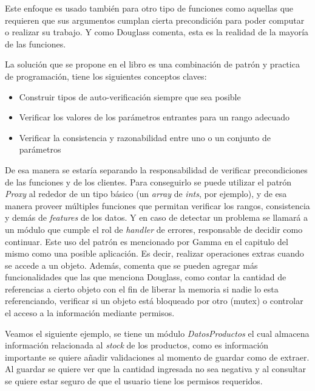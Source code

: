 Este enfoque es usado también para otro tipo de funciones como aquellas que requieren que sus argumentos cumplan cierta precondición para poder computar o realizar su trabajo. Y como Douglass comenta, esta es la realidad de la mayoría de las funciones.

La solución que se propone en el libro es una combinación de patrón y practica de programación, tiene los siguientes conceptos claves:

\begin{itemize}
    \item Construir tipos de auto-verificación siempre que sea posible
    \item Verificar los valores de los parámetros entrantes para un rango adecuado
    \item Verificar la consistencia y razonabilidad entre uno o un conjunto de parámetros
\end{itemize}

De esa manera se estaría separando la responsabilidad de verificar precondiciones de las funciones y de los clientes. Para conseguirlo se puede utilizar el patrón \textit{Proxy} al rededor de un tipo básico (un \textit{array} de \textit{ints}, por ejemplo), y de esa manera proveer múltiples funciones que permitan verificar los rangos, consistencia y demás de \textit{features} de los datos. Y en caso de detectar un problema se llamará a un módulo que cumple el rol de \textit{handler} de errores, responsable de decidir como continuar. Este uso del patrón es mencionado por Gamma en el capitulo del mismo como una posible aplicación. Es decir, realizar operaciones extras cuando se accede a un objeto. Además, comenta que se pueden agregar más funcionalidades que las que menciona Douglass, como contar la cantidad de referencias a cierto objeto con el fin de liberar la memoria si nadie lo esta referenciando, verificar si un objeto está bloqueado por otro (mutex) o controlar el acceso a la información mediante permisos.

Veamos el siguiente ejemplo, se tiene un módulo \textit{DatosProductos} el cual almacena información relacionada al \textit{stock} de los productos, como es información importante se quiere añadir validaciones al momento de guardar como de extraer. Al guardar se quiere ver que la cantidad ingresada no sea negativa y al consultar se quiere estar seguro de que el usuario tiene los permisos requeridos.

